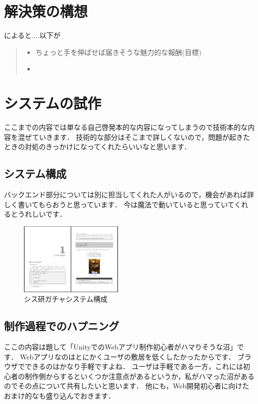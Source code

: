 \section{解決策の構想}
\cite{izon}によると....以下が
\begin{quote}
  \begin{itemize}
    \item ちょっと手を伸ばせば届きそうな魅力的な報酬(目標)
    \item 
  \end{itemize}
\end{quote}
\section{システムの試作}
ここまでの内容では単なる自己啓発本的な内容になってしまうので技術本的な内容を混ぜていきます．
技術的な部分はそこまで詳しくないので，問題が起きたときの対処のきっかけになってくれたらいいなと思います．
\subsection{システム構成}
バックエンド部分については別に担当してくれた人がいるので，機会があれば詳しく書いてもらおうと思っています．
今は魔法で動いていると思っていてくれるとうれしいです．
\begin{figure}
  \begin{center}
    \includegraphics[width=5cm]{image/04-Intarasting/chap1/sample.png}
    \caption{シス研ガチャシステム構成}
    \label{syskengacha_system}
  \end{center}
\end{figure}
\subsection{制作過程でのハプニング}
ここの内容は題して「UnityでのWebアプリ制作初心者がハマりそうな沼」です．
Webアプリなのはとにかくユーザの敷居を低くしたかったからです．
ブラウザでできるのはかなり手軽ですよね．
ユーザは手軽である一方，これには初心者の制作側からするといくつか注意点があるというか，私がハマった沼があるのでその点について共有したいと思います．
他にも，Web開発初心者に向けたおまけ的なも盛り込んでおきます．
